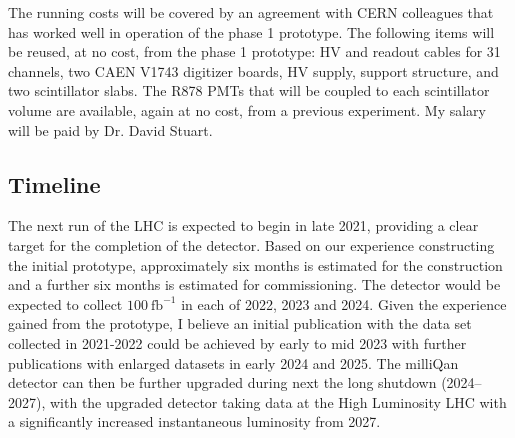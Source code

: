 \documentclass[11pt]{article}
\theoremstyle{plain} \numberwithin{equation}{section}
\theoremstyle{definition}
\begin{document}
The running costs will be covered by an agreement with CERN colleagues that has 
worked well in operation of the phase 1 prototype. The following items will be reused, at no 
cost, from the phase 1 prototype: HV and readout cables for 31 channels, two CAEN V1743 digitizer boards,
HV supply, support structure, and two scintillator slabs. The R878 PMTs that will be coupled to each scintillator volume
are available, again at no cost, from a previous experiment. My salary will be paid by
Dr. David Stuart.

\subsection*{Timeline}

The next run of the LHC is expected to begin in late 2021, providing a clear target 
for the completion of the detector. Based on our experience constructing the initial prototype, 
approximately six months is estimated for the construction and a further six months is
estimated for commissioning. The detector would be expected to 
collect $100~\text{fb}^{-1}$ in each of 2022, 2023 and 2024.
Given the experience gained from the prototype, I believe an initial publication with the data set collected 
in 2021-2022 could be achieved by early to mid 2023 with further publications with enlarged datasets 
in early 2024 and 2025. The milliQan detector can then be further 
upgraded during next the long shutdown (2024--2027), with the upgraded
detector taking data at the High Luminosity LHC with a significantly increased instantaneous luminosity from 2027. 






\end{document}
